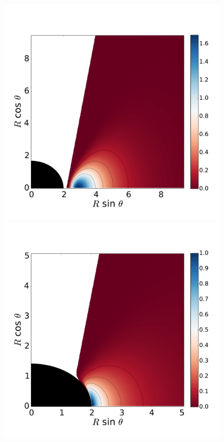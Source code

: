 \documentclass[twocolumn,aps,showpacs,showkeys,prd,superscriptaddress,byrevtex, amsmath]{revtex4-1}
\begin{document}
\begin{figure}
\hspace{-0.2cm}
\includegraphics[scale=0.14]{figures/fig10_09__10.pdf}
\\
\includegraphics[scale=0.14]{figures/fig10_09999_10.pdf}

\end{figure}
\end{document}
